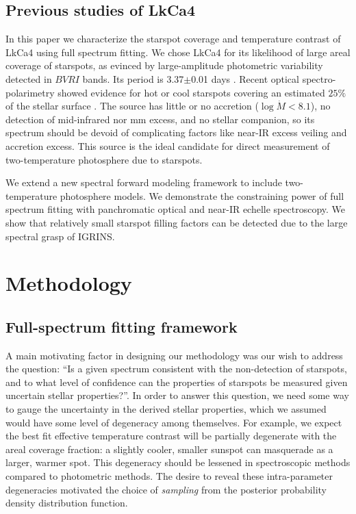 \documentclass[onecolumn]{emulateapj}%
\newcommand{\name}{LkCa4 }
\begin{document}
\subsection{Previous studies of \name}

In this paper we characterize the starspot coverage and temperature contrast of \name using full spectrum fitting.  We chose \name for its likelihood of large areal coverage of starspots, as evinced by large-amplitude photometric variability  detected in $BVRI$ bands.  Its period is 3.37$\pm$0.01 days \citep{1993AJ....106.1608V,1994IBVS.4042....1G}.  Recent optical spectro-polarimetry showed evidence for hot or cool starspots covering an estimated $25\%$ of the stellar surface \citep{2014MNRAS.444.3220D}.  The source has little or no accretion ($\log{\dot M} < 8.1$), no detection of mid-infrared nor mm excess, and no stellar companion, so its spectrum should be devoid of complicating factors like near-IR excess veiling and accretion excess.  This source is the ideal candidate for direct measurement of two-temperature photosphere due to starspots.

We extend a new spectral forward modeling framework to include two-temperature photosphere models.  We demonstrate the constraining power of full spectrum fitting with panchromatic optical and near-IR echelle spectroscopy.  We show that relatively small starspot filling factors can be detected due to the large spectral grasp of IGRINS.  

\section{Methodology}\label{sec:methods} 


\subsection{Full-spectrum fitting framework}


A main motivating factor in designing our methodology was our wish to address the question: ``Is a given spectrum consistent with the non-detection of starspots, and to what level of confidence can the properties of starspots be measured given uncertain stellar properties?''.  In order to answer this question, we need some way to gauge the uncertainty in the derived stellar properties, which we assumed would have some level of degeneracy among themselves.  For example, we expect the best fit effective temperature contrast will be partially degenerate with the areal coverage fraction: a slightly cooler, smaller sunspot can masquerade as a larger, warmer spot.  This degeneracy should be lessened in spectroscopic methods compared to photometric methods.  The desire to reveal these intra-parameter degeneracies motivated the choice of \emph{sampling} from the posterior probability density distribution function.
\end{document}

